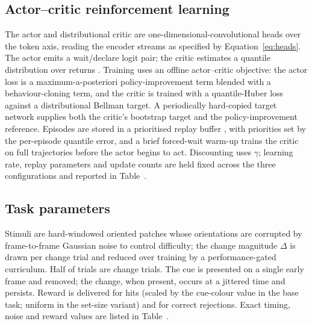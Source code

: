 \subsection{Actor--critic reinforcement learning}
The actor and distributional critic are one-dimensional-convolutional heads over the token
axis, reading the encoder streams as specified by Equation~\eqref{eq:heads}. The actor emits
a wait/declare logit pair; the critic estimates a quantile distribution over returns
\citep{dabney2018distributional, bellemare2017distributional}. Training uses an offline
actor--critic objective: the actor loss is a maximum-a-posteriori policy-improvement term
\citep{abdolmaleki2018maximum, springenberg2024offline} blended with a behaviour-cloning
term, and the critic is trained with a quantile-Huber loss against a distributional Bellman
target. A periodically hard-copied target network supplies both the critic's bootstrap target
and the policy-improvement reference. Episodes are stored in a prioritised replay buffer
\citep{schaul2016prioritized}, with priorities set by the per-episode quantile error, and a
brief forced-wait warm-up trains the critic on full trajectories before the actor begins to
act. Discounting uses $\gamma$; learning rate, replay parameters and update counts are held
fixed across the three configurations and reported in Table~.

\subsection{Task parameters}
Stimuli are hard-windowed oriented patches whose orientations are corrupted by frame-to-frame
Gaussian noise to control difficulty; the change magnitude $\Delta$ is drawn per change trial
and reduced over training by a performance-gated curriculum. Half of trials are change trials.
The cue is presented on a single early frame and removed; the change, when present, occurs at a
jittered time and persists. Reward is delivered for hits (scaled by the cue-colour value in the
base task; uniform in the set-size variant) and for correct rejections. Exact timing, noise and
reward values are listed in Table~.

